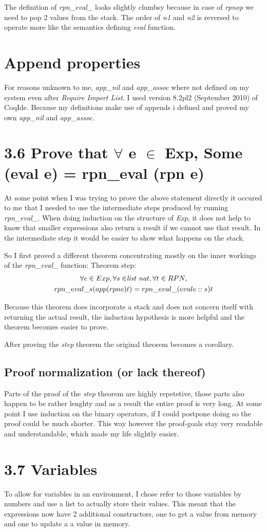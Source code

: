 \documentclass[10pt,a4paper,usenames,dvipnames]{article}
\begin{document}
The definition of \emph{rpn\_eval\_} looks slightly clumbsy because in case of \emph{rpnop} we need to pop 2 values from the stack. The order of \emph{n1} and \emph{n2} is reversed to operate more like the semantics defining \emph{eval} function.

\section*{ Append properties }

For reasons unknown to me, \emph{app\_nil} and \emph{app\_assoc} where not defined on my system even after \emph{Require Import List}. I used version 8.2pl2 (September 2010) of CoqIde. Because my definitions make use of appends i defined and proved my own \emph{app\_nil} and \emph{app\_assoc}.

\section*{ 3.6 Prove that $\forall$ e $\in$ Exp, Some (eval e) = rpn\_eval (rpn e) }

At some point when I was trying to prove the above statement directly it occured to me that I needed to use the intermediate steps produced by running \emph{rpn\_eval\_}. When doing induction on the structure of \emph{Exp}, it does not help to know that smaller expressions also return a result if we cannot use that result. In the intermediate step it would be easier to show what happens on the stack.

So I first proved a different theorem concentrating mostly on the inner workings of the \emph{rpn\_eval\_} function: Theorem step:
\begin{multline*}
	\forall e \in Exp, \forall s \in $\emph{list nat}$, \forall t \in RPN, \\
	rpn\_eval\_ s (app (rpn e) t) = rpn\_eval\_ (eval e :: s) t
\end{multline*}

Because this theorem does incorporate a stack and does not concern itself with returning the actual result, the induction hypothesis is more helpful and the theorem becomes easier to prove.

After proving the \emph{step} theorem the original theorem becomes a corollary.

\subsection*{ Proof normalization (or lack thereof) }
Parts of the proof of the \emph{step} theorem are highly repetetive, those parts also happen to be rather lenghty and as a result the entire proof is very long. At some point I use induction on the binary operators, if I could postpone doing so the proof could be much shorter. This way however the proof-goals stay very readable and understandable, which made my life slightly easier.

\section*{ 3.7 Variables }
To allow for variables in an environment, I chose refer to those variables by numbers and use a list to actually store their values. This meant that the expressions now have 2 additional constructors, one to get a value from memory and one to update a a value in memory.
\end{document}
